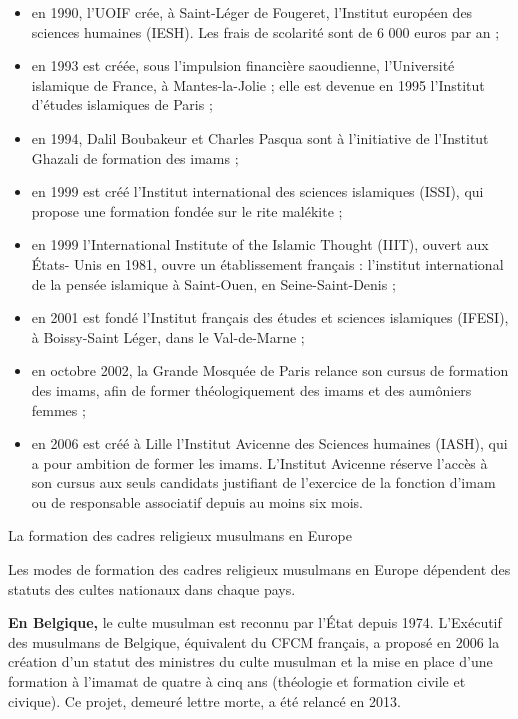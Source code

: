 \begin{itemize}
\item
  en 1990, l'UOIF crée, à Saint-Léger de Fougeret, l'Institut européen
  des sciences humaines (IESH). Les frais de scolarité sont de 6 000
  euros par an ;
\item
  en 1993 est créée, sous l'impulsion financière saoudienne,
  l'Université islamique de France, à Mantes-la-Jolie ; elle est devenue
  en 1995 l'Institut d'études islamiques de Paris ;
\item
  en 1994, Dalil Boubakeur et Charles Pasqua sont à l'initiative de
  l'Institut Ghazali de formation des imams ;
\item
  en 1999 est créé l'Institut international des sciences islamiques
  (ISSI), qui propose une formation fondée sur le rite malékite ;
\item
  en 1999 l'International Institute of the Islamic Thought (IIIT),
  ouvert aux États- Unis en 1981, ouvre un établissement français :
  l'institut international de la pensée islamique à Saint-Ouen, en
  Seine-Saint-Denis ;
\item
  en 2001 est fondé l'Institut français des études et sciences
  islamiques (IFESI), à Boissy-Saint Léger, dans le Val-de-Marne ;
\item
  en octobre 2002, la Grande Mosquée de Paris relance son cursus de
  formation des imams, afin de former théologiquement des imams et des
  aumôniers femmes ;
\end{itemize}





\begin{itemize}
\item
  en 2006 est créé à Lille l'Institut Avicenne des Sciences humaines
  (IASH), qui a pour ambition de former les imams. L'Institut Avicenne
  réserve l'accès à son cursus aux seuls candidats justifiant de
  l'exercice de la fonction d'imam ou de responsable associatif depuis
  au moins six mois.
\end{itemize}

La formation des cadres religieux musulmans en Europe


Les modes de formation des cadres religieux musulmans en Europe
dépendent des statuts des cultes nationaux dans chaque pays.

\textbf{En Belgique,} le culte musulman est reconnu par l'État depuis
1974. L'Exécutif des musulmans de Belgique, équivalent du CFCM français,
a proposé en 2006 la création d'un statut des ministres du culte
musulman et la mise en place d'une formation à l'imamat de quatre à cinq
ans (théologie et formation civile et civique). Ce projet, demeuré
lettre morte, a été relancé en 2013.

